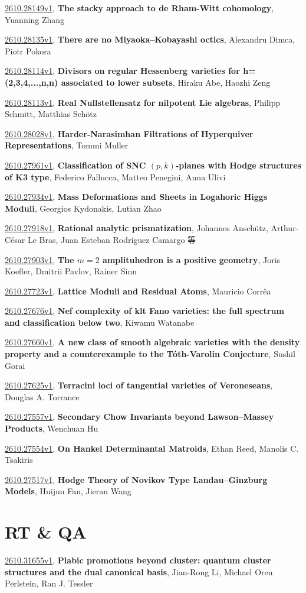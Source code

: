 \documentclass[9pt, a4paper]{article}
\theoremstyle{plain}
\theoremstyle{definition}
\theoremstyle{remark}
\newcommand{\arxiv}[3]{\href{https://arxiv.org/abs/#1}{#1}, \textbf{\textcolor{arxivblue}{#2}}, #3}
\begin{document}
\arxiv{2610.28149v1}{The stacky approach to de Rham-Witt cohomology}{Yuanning Zhang}

\arxiv{2610.28135v1}{There are no Miyaoka--Kobayashi octics}{Alexandru Dimca, Piotr Pokora}

\arxiv{2610.28114v1}{Divisors on regular Hessenberg varieties for h=(2,3,4,...,n,n) associated to lower subsets}{Hiraku Abe, Haozhi Zeng}

\arxiv{2610.28113v1}{Real Nullstellensatz for nilpotent Lie algebras}{Philipp Schmitt, Matthias Schötz}

\arxiv{2610.28028v1}{Harder-Narasimhan Filtrations of Hyperquiver Representations}{Tommi Muller}

\arxiv{2610.27961v1}{Classification of SNC $(p,k)$-planes with Hodge structures of K3 type}{Federico Fallucca, Matteo Penegini, Anna Ulivi}

\arxiv{2610.27934v1}{Mass Deformations and Sheets in Logahoric Higgs Moduli}{Georgios Kydonakis, Lutian Zhao}

\arxiv{2610.27918v1}{Rational analytic prismatization}{Johannes Anschütz, Arthur-César Le Bras, Juan Esteban Rodríguez Camargo 等}

\arxiv{2610.27903v1}{The $m=2$ amplituhedron is a positive geometry}{Joris Koefler, Dmitrii Pavlov, Rainer Sinn}

\arxiv{2610.27723v1}{Lattice Moduli and Residual Atoms}{Mauricio Corrêa}

\arxiv{2610.27676v1}{Nef complexity of klt Fano varieties: the full spectrum and classification below two}{Kiwamu Watanabe}

\arxiv{2610.27660v1}{A new class of smooth algebraic varieties with the density property and a counterexample to the Tóth-Varolin Conjecture}{Sushil Gorai}

\arxiv{2610.27625v1}{Terracini loci of tangential varieties of Veroneseans}{Douglas A. Torrance}

\arxiv{2610.27557v1}{Secondary Chow Invariants beyond Lawson--Massey Products}{Wenchuan Hu}

\arxiv{2610.27554v1}{On Hankel Determinantal Matroids}{Ethan Reed, Manolis C. Tsakiris}

\arxiv{2610.27517v1}{Hodge Theory of Novikov Type Landau--Ginzburg Models}{Huijun Fan, Jieran Wang}


\section{RT \& QA}
\arxiv{2610.31655v1}{Plabic promotions beyond cluster: quantum cluster structures and the dual canonical basis}{Jian-Rong Li, Michael Oren Perlstein, Ran J. Tessler}
\end{document}
